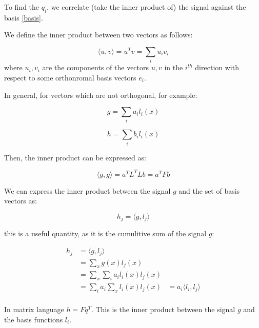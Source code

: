 To find the \(q_i\), we correlate (take the inner product of) the signal against the basis \eqref{basis}.

\begin{definition}
We define the inner product between two vectors as follows:

\begin{equation}
\langle u, v \rangle = u^T v = \sum_i u_i v_i
\end{equation}	
where \(u_i, v_i\) are the components of the vectors \(u,v\) in the \(i^{th}\) direction with respect to some orthonromal basis vectors \(e_i\).

In general, for vectors which are not orthogonal, for example:

\begin{equation}
g = \sum_i a_i l_i\left(x\right)
\end{equation}

\begin{equation}
h = \sum_i b_i l_i\left(x\right)
\end{equation}

Then, the inner product can be expressed as:

\begin{equation}
\langle g, g \rangle = a^TL^TL b = a^T F b
\end{equation}	

\end{definition}

\begin{definition}
We can express the inner product between the signal \(g\) and the set of basis vectors as:

\begin{equation}
h_j = \langle g, l_j \rangle
\end{equation}

this is a useful quantity, as it is the cumulitive sum of the signal \(g\):

\begin{align}
h_j &= \langle g, l_j \rangle \\
&= \sum_x g\left(x\right) l_j\left(x\right) \\
&= \sum_x \sum_i a_i l_i\left(x\right) l_j\left(x\right) \\
&= \sum_i a_i \sum_x l_i\left(x\right) l_j\left(x\right)
&= a_i \langle l_i, l_j\rangle \\
\end{align}

In matrix language \(h = F q^T\). This is the inner product between the signal \(g\) and the basis functions \(l_i\).
\end{definition}


